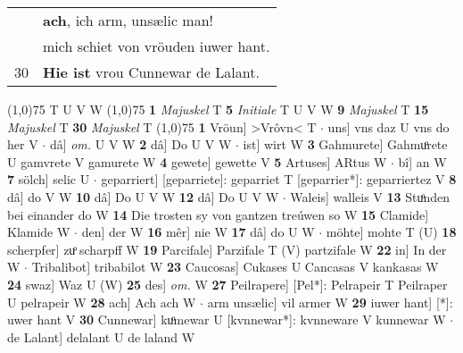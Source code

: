 \documentclass[8pt,a4paper,notitlepage]{article}
\begin{document}
\begin{table}[ht]
\begin{minipage}[t]{0.5\linewidth}
\begin{tabular}{rl}
 & \textbf{ach}, ich arm, unsælic man!\\ 
 & mich schiet von vröuden iuwer hant.\\ 
30 & \textbf{Hie ist} vrou Cunnewar de Lalant.\\ 
\end{tabular}
\scriptsize
\line(1,0){75} \newline
T U V W \newline
\line(1,0){75} \newline
\textbf{1} \textit{Majuskel} T  \textbf{5} \textit{Initiale} T U V W  \textbf{9} \textit{Majuskel} T  \textbf{15} \textit{Majuskel} T  \textbf{30} \textit{Majuskel} T  \newline
\line(1,0){75} \newline
\textbf{1} Vröun] >Vrôvn< T  $\cdot$ uns] vns daz U vns do her V  $\cdot$ dâ] \textit{om.} U V W \textbf{2} dâ] Do U V W  $\cdot$ ist] wirt W \textbf{3} Gahmurete] Gahmuͦrete U gamvrete V gamurete W \textbf{4} gewete] gewette V \textbf{5} Artuses] ARtus W  $\cdot$ bî] an W \textbf{7} sölch] selic U  $\cdot$ geparriert] [geparriete]: geparriet T [geparrier*]: geparriertez V \textbf{8} dâ] do V W \textbf{10} dâ] Do U V W \textbf{12} dâ] Do U V W  $\cdot$ Waleis] walleis V \textbf{13} Stuͦnden bei einander do W \textbf{14} Die trosten sy von gantzen treúwen so W \textbf{15} Clamide] Klamide W  $\cdot$ den] der W \textbf{16} mêr] nie W \textbf{17} dâ] do U W  $\cdot$ möhte] mohte T (U) \textbf{18} scherpfer] zuͦ scharpff W \textbf{19} Parcifale] Parzifale T (V) partzifale W \textbf{22} in] In der W  $\cdot$ Tribalibot] tribabilot W \textbf{23} Caucosas] Cukases U Cancasas V kankasas W \textbf{24} swaz] Waz U (W) \textbf{25} des] \textit{om.} W \textbf{27} Peilrapere] [Pel*]: Pelrapeir T Peilraper U pelrapeir W \textbf{28} ach] Ach ach W  $\cdot$ arm unsælic] vil armer W \textbf{29} iuwer hant] [*]: uwer hant V \textbf{30} Cunnewar] kuͦmewar U [kvnnewar*]: kvnneware V kunnewar W  $\cdot$ de Lalant] delalant U de laland W \newline
\end{minipage}
\end{table}
\end{document}
